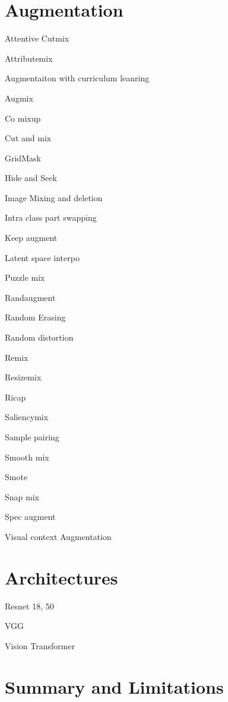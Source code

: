 \section{Augmentation}
Attentive Cutmix

Attributemix

Augmentaiton with curriculum leanring

Augmix

Co mixup

Cut and mix

GridMask

Hide and Seek

Image Mixing and deletion

Intra class part swapping

Keep augment

Latent space interpo

Puzzle mix

Randaugment

Random Erasing

Random distortion

Remix

Resizemix

Ricap

Saliencymix

Sample pairing

Smooth mix

Smote

Snap mix

Spec augment

Visual context Augmentation

\section{Architectures}
Resnet 18, 50

VGG

Vision Transformer

\section{Summary and Limitations}
